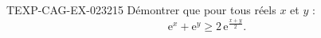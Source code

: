 \begin{exercice}{TEXP-CAG-EX-023}{2}{15}
Démontrer que pour tous réels $x$ et $y$ :
\[ \mathrm{e}^x + \mathrm{e}^y \geq 2\,\mathrm{e}^{\frac{x+y}{2}}. \]

\end{exercice}
